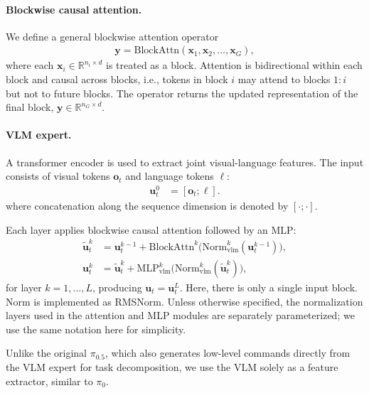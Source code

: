\paragraph{Blockwise causal attention.}
We define a general blockwise attention operator
\begin{align}
\mathbf{y}
=
\mathrm{BlockAttn}(\mathbf{x}_1, \mathbf{x}_2, \dots, \mathbf{x}_G),
\end{align}
where each $\mathbf{x}_i \in \mathbb{R}^{n_i \times d}$ is treated as a block.
Attention is bidirectional within each block and causal across blocks, i.e.,
tokens in block $i$ may attend to blocks $1{:}i$ but not to future blocks.
The operator returns the updated representation of the final block,
$\mathbf{y} \in \mathbb{R}^{n_G \times d}$.


\paragraph{VLM expert.}
A transformer encoder is used to extract joint visual-language features.
The input consists of visual tokens $\mathbf{o}_t$ and language tokens $\boldsymbol{\ell}$:
\begin{align}
\mathbf{u}_t^{0} &= [\mathbf{o}_t;\boldsymbol{\ell}].
\end{align}
where concatenation along the sequence dimension is denoted by $[\cdot;\cdot]$.

Each layer applies blockwise causal attention followed by an MLP:
\begin{align}
\tilde{\mathbf{u}}_t^{k}
&=
\mathbf{u}_t^{k-1}
+
\mathrm{BlockAttn}^{k}\!\big(\mathrm{Norm}^k_\text{vlm}(\mathbf{u}_t^{k-1})\big),\\
\mathbf{u}_t^{k}
&=
\tilde{\mathbf{u}}_t^{k}
+
\mathrm{MLP}_{\text{vlm}}^{k}\!\big(\mathrm{Norm}^k_\text{vlm}(\tilde{\mathbf{u}}_t^{k})\big),
\end{align}
for layer $k=1,\dots,L$, producing $\mathbf{u}_t=\mathbf{u}_t^{L}$. Here, there is only a single input block. $\mathrm{Norm}$ is implemented as RMSNorm. Unless otherwise specified, the normalization layers used in the attention and MLP modules are separately parameterized; we use the same notation here for simplicity.

Unlike the original $\pi_{0.5}$, which also generates low-level commands directly from the VLM expert for task decomposition, we use the VLM solely as a feature extractor, similar to $\pi_0$.



